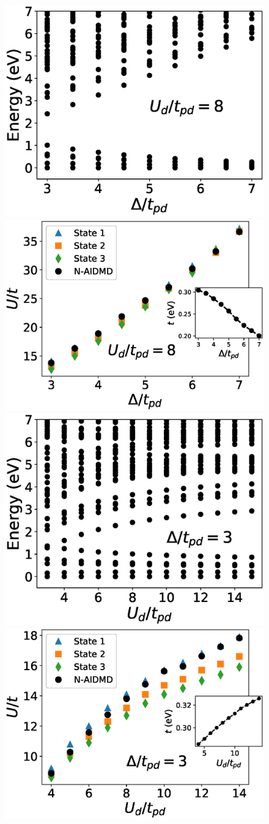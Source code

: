 \begin{figure}[]
\centering
\includegraphics[width=0.45\linewidth]{./Figures/spectrum_vs_ep_Ud_8.eps}
\includegraphics[width=0.49\linewidth]{./Figures/U_and_hopping_combined_vs_ep_Ud_8.eps}
\includegraphics[width=0.45\linewidth]{./Figures/spectrum_vs_Ud_ep_3.eps}
\includegraphics[width=0.48\linewidth]{./Figures/U_and_hopping_combined_vs_Ud_ep_3.eps}

\end{figure}
